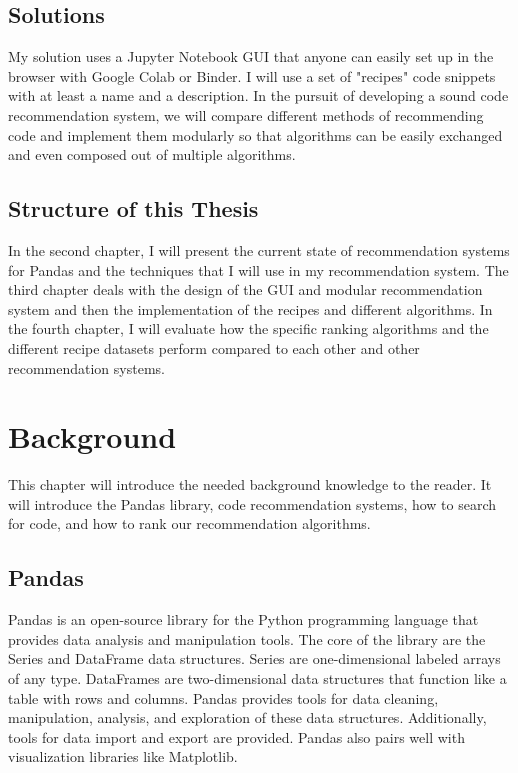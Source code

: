 \documentclass[
     12pt,                    %
     a4paper,             %
     BCOR=10mm,     %
     DIV=14,                 %
     listof=totoc,                    %
     bibliography=totoc,       %
     index=totoc,              %
     twoside,
     headsepline
     ]{scrreprt}
\begin{document}
\section{Solutions}

My solution uses a Jupyter Notebook GUI that anyone can easily set up in the browser with Google Colab or Binder. I will use a set of "recipes" code snippets with at least a name and a description.
In the pursuit of developing a sound code recommendation system, we will compare different methods of recommending code and implement them modularly so that algorithms can be easily exchanged and even composed out of multiple algorithms.

\section{Structure of this Thesis}

In the second chapter, I will present the current state of recommendation systems for Pandas and the techniques that I will use in my recommendation system.
The third chapter deals with the design of the GUI and modular recommendation system and then the implementation of the recipes and different algorithms.
In the fourth chapter, I will evaluate how the specific ranking algorithms and the different recipe datasets perform compared to each other and other recommendation systems.

\chapter{Background}\label{background}

This chapter will introduce the needed background knowledge to the reader. It will introduce the Pandas library, code recommendation systems, how to search for code, and how to rank our recommendation algorithms. 

\section{Pandas}

Pandas is an open-source library for the Python programming language that provides data analysis and manipulation tools. The core of the library are the Series and DataFrame data structures. Series are one-dimensional labeled arrays of any type. DataFrames are two-dimensional data structures that function like a table with rows and columns. Pandas provides tools for data cleaning, manipulation, analysis, and exploration of these data structures. Additionally, tools for data import and export are provided. Pandas also pairs well with visualization libraries like Matplotlib.
\end{document}
